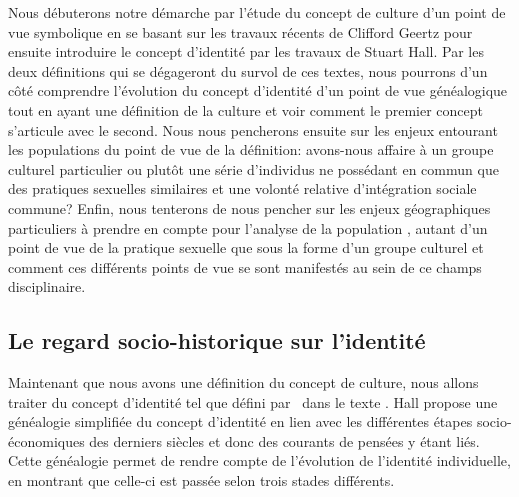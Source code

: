 Nous débuterons notre démarche par l'étude du concept de culture d'un point de vue symbolique en se basant sur les travaux récents de Clifford Geertz pour ensuite introduire le concept d'identité par les travaux de Stuart Hall. 
Par les deux définitions qui se dégageront du survol de ces textes, nous pourrons d'un côté comprendre l'évolution du concept d'identité d'un point de vue généalogique tout en ayant une définition de la culture et voir comment le premier concept s'articule avec le second. 
Nous nous pencherons ensuite sur les enjeux entourant les populations \lgbt{} du point de vue de la définition: avons-nous affaire à un groupe culturel particulier ou plutôt une série d'individus ne possédant en commun que des pratiques sexuelles similaires et une volonté relative d'intégration sociale commune? 
Enfin, nous tenterons de nous pencher sur les enjeux géographiques particuliers à prendre en compte pour l'analyse de la population \lgbt{}, autant d'un point de vue de la pratique sexuelle que sous la forme d'un groupe culturel et comment ces différents points de vue se sont manifestés au sein de ce champs disciplinaire.


\subsection{Le regard socio-historique sur l'identité}
\label{sec:le_regard_sociohistoirique_sur_l_identit_} Maintenant que nous avons une définition du concept de culture, nous allons traiter du concept d'identité tel que défini par~\citet{Hall1996a} dans le texte . 
Hall propose une généalogie simplifiée du concept d'identité en lien avec les différentes étapes socio-économiques des derniers siècles et donc des courants de pensées y étant liés. 
Cette généalogie permet de rendre compte de l'évolution de l'identité individuelle, en montrant que celle-ci est passée selon trois stades différents.

